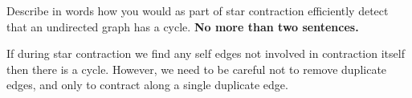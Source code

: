 \begin{problem}
\ask
Describe in words how you would as part of star contraction 
efficiently detect that an undirected graph has a cycle.  \textbf{No more than two sentences.}

\sol
If during star contraction we find any self edges not involved in
contraction itself then there is a cycle.   However,
we need to be careful not to remove duplicate edges, and only to
contract along a single duplicate edge.

\end{problem}
